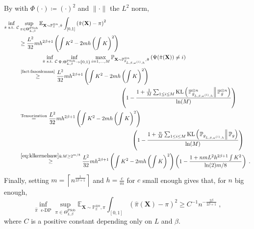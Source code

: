 \documentclass[10pt]{article} %
\newcommand{\Prob}[0]{\mathbb{P}}
\newcommand{\E}[0]{\mathbb{E}}
\newcommand\vect[1]{\mathbf{#1}}
\newcommand\kl[2]{\mathrm{KL}\left( \left. {#1}\right\Vert {#2} \right)}
\newcommand\p[1]{\left( {#1}\right)}
\newcommand\ceil[1]{\left\lceil {#1}\right\rceil}
\newcommand\RG[1]{\textcolor{red}{#1}}
\newcommand\CL[1]{\textcolor{blue}{#1}}
\begin{document}
By  with $\Phi(\cdot) \coloneqq (\cdot)^2$ and $\|\cdot\|$ the $L^2$ norm,
\begin{equation}
\label{eq:dqslijuhfvsjkdcv}
    \begin{aligned}
    \inf_{\hat{\pi}  \text{ s.t. } \mathcal{C}} &\sup_{\pi \in \Theta^{\text{PSob}}_{L, \beta}}
    \E_{\vect{X} \sim \Prob_{\pi}^{\otimes n}, \hat{\pi}} \int_{[0, 1]}\p{\hat{\pi}(\vect{X})- \pi}^2 \\
    &\geq 
    \frac{L^2}{32}  m h^{2 \beta + 1} \p{  \int K^2 - 2m h \p{\int K}^2} \\
    &\quad\quad\quad\quad\inf_{\hat{\pi} \text{ s.t. } \mathcal{C}} \inf_{\Psi :\Theta^{\text{PSob}}_{L, \beta} \rightarrow \{0, 1\}}
    \max_{i = 1, \dots, M}   \Prob_{\vect{X} \sim \Prob_{g_{L, \beta, \omega^{(i)}, h}}^{\otimes n}, \hat{\pi}}                \p{\Psi(\hat{\pi}(\vect{X})) \neq i} \\
    &\stackrel{\text{\Cref{fact:fanoslemma}}}{\geq}
    \frac{L^2}{32} m h^{2 \beta + 1}  \p{ \int K^2 - 2m h \p{\int K}^2} \\
    &\quad\quad\quad\quad\quad\quad\quad\quad\quad\quad\quad\quad\quad\quad\quad\quad\quad\quad
    \p{1 - \frac{1 + \frac{1}{M} \sum_{1\leq i\leq M} \kl{\Prob_{g_{L, \beta, \omega^{(i)}, h}}^{\otimes n}}{\Prob_{g}^{\otimes n}}}{\ln (M)}} \\
    &\stackrel{\text{Tensorization}}{=}
   \frac{L^2}{32} mh^{2 \beta + 1} \p{  \int K^2 - 2m h \p{\int K}^2} \\
    &\quad\quad\quad\quad\quad\quad\quad\quad\quad\quad\quad\quad\quad\quad\quad\quad\quad\quad\quad\quad
    \p{1 - \frac{1 + \frac{n}{M} \sum_{1\leq i\leq M} \kl{\Prob_{g_{L, \beta, \omega^{(i)}, h}}}{\Prob_{g}}}{\ln (M)}} \\ 
    &\stackrel{\eqref{eq:klkernelsaw}\& M \geq 2^{m/8}}{\geq}
    \frac{L^2}{32} m h^{2 \beta + 1}  \p{ \int K^2 - 2m h \p{\int K}^2}
    \p{1 - \frac{1 + n m L^2 h^{2\beta + 1} \int K^2}{\ln (2) m/8}}\;.
    \end{aligned}
\end{equation}
Finally, setting $m = \ceil{ n^{\frac{1}{2 \beta + 1}}}$ and $h = \frac{c}{m}$ for $c$ small enough gives that, for $n$ big enough, 
\begin{equation*}
    \inf_{\hat{\pi} \text{ $\epsilon$-DP}} \sup_{\pi \in \Theta^{\text{PSob}}_{L, \beta}}
    \E_{\vect{X} \sim \Prob_{\pi}^{\otimes n}, \hat{\pi}} \int_{[0, 1]}\p{\hat{\pi}(\vect{X})- \pi}^2 \geq C^{-1} n^{-\frac{2 \beta}{2 \beta + 1}} \;,
\end{equation*}
where $C$ is a positive constant depending only on $L$ and $\beta$.
\end{document}
